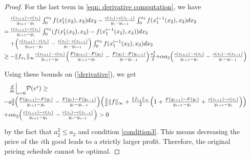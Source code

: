 \documentclass[12pt,reqno]{amsart}
\begin{document}
\begin{proof}
 For the last term in \eqref{eqn: derivative computation}, we have
\[\hspace{-6pt}\begin{array}{ll}
    &\hspace{-8pt}\frac{c(z_{i+1})-c(z_i)}{y_{i+1}-y_i}\int_0^{a_2}f(x_1^{i}(x_2),x_2)dx_2-\frac{c(z_{i})-c(z_{i-1})}{y_i-y_{i-1}}\int_0^{a_2}f(x_1^{i-1}(x_2),x_2)dx_2\vspace{3pt}\\
    =&\hspace{-8pt}\frac{c(z_{i+1})-c(z_i)}{y_{i+1}-y_i}\int_0^{a_2}(f(x_1^{i}(x_2),x_2)-f(x_1^{i-1}(x_2),x_2))dx_2\vspace{3pt}\\
    &\hspace{-8pt}+\Big(\frac{c(z_{i+1})-c(z_i)}{y_{i+1}-y_i}-\frac{c(z_{i})-c(z_{i-1})}{y_i-y_{i-1}}\Big)\int_0^{a_2}f(x_1^{i-1}(x_2),x_2)dx_2\vspace{3pt}\\
    \ge&\hspace{-8pt}-\|f_{x_1}\|_\infty\frac{c(z_{i+1})-c(z_i)}{y_{i+1}-y_i}\Big(\frac{F(y_{i+1})-F(y_i)}{y_{i+1}-y_i}-\frac{F(y_{i})-F(y_{i-1})}{y_{i}-y_{i-1}}\Big)\frac{a_2^2}{2}\hspace{-3pt}+\hspace{-3pt}\alpha a_2\Big(\frac{c(z_{i+1})-c(z_i)}{y_{i+1}-y_i}-\frac{c(z_{i})-c(z_{i-1})}{y_i-y_{i-1}}\Big)
\end{array}\]

Using these bounds on (\ref{derivative}), we get
\[\hspace{-0.3cm}\begin{array}{ll}
&\frac{d}{d\epsilon}\Big|_{\epsilon=0} \mathcal P(v^\epsilon) \ge\vspace{3pt}\\
&\hspace{-0.3cm} -a_2^2\Big(\frac{F(y_{i+1})-F(y_i)}{y_{i+1}-y_i}-\frac{F(y_i)-F(y_{i-1})}{y_i-y_{i-1}}\Big)\Big(\frac{3}{2}\|f\|_\infty+\frac{\|f_{x_1}\|_\infty}{2}\Big(1+\frac{F(y_{i+1})-F(y_i)}{y_{i+1}-y_i}+\frac{c(z_{i+1})-c(z_i)}{y_{i+1}-y_i}\Big)\Big)\vspace{3pt}\\
&\hspace{-0.3cm}+\alpha a_2\Big(\frac{c(z_{i+1})-c(z_i)}{y_{i+1}-y_i}-\frac{c(z_{i})-c(z_{i-1})}{y_i-y_{i-1}}\Big)>0 \vspace{3pt}\\
\end{array}\]
by the fact that $a_2^2\le a_2$ and condition \ref{condition3}. This means decreasing the price of the $i$th good leads to a strictly larger profit.  Therefore, the original pricing schedule cannot be optimal.\end{proof}
\end{document}
